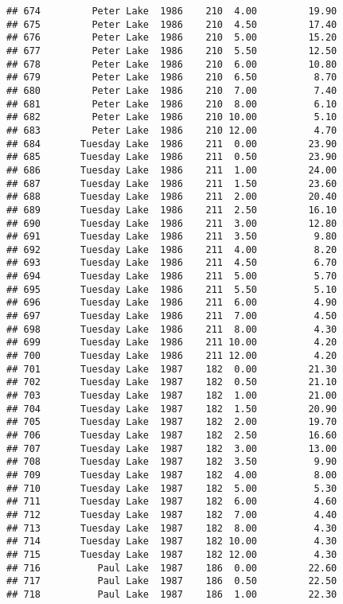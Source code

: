 \documentclass[
]{article}
\begin{document}
\begin{verbatim}
## 674         Peter Lake  1986    210  4.00         19.90
## 675         Peter Lake  1986    210  4.50         17.40
## 676         Peter Lake  1986    210  5.00         15.20
## 677         Peter Lake  1986    210  5.50         12.50
## 678         Peter Lake  1986    210  6.00         10.80
## 679         Peter Lake  1986    210  6.50          8.70
## 680         Peter Lake  1986    210  7.00          7.40
## 681         Peter Lake  1986    210  8.00          6.10
## 682         Peter Lake  1986    210 10.00          5.10
## 683         Peter Lake  1986    210 12.00          4.70
## 684       Tuesday Lake  1986    211  0.00         23.90
## 685       Tuesday Lake  1986    211  0.50         23.90
## 686       Tuesday Lake  1986    211  1.00         24.00
## 687       Tuesday Lake  1986    211  1.50         23.60
## 688       Tuesday Lake  1986    211  2.00         20.40
## 689       Tuesday Lake  1986    211  2.50         16.10
## 690       Tuesday Lake  1986    211  3.00         12.80
## 691       Tuesday Lake  1986    211  3.50          9.80
## 692       Tuesday Lake  1986    211  4.00          8.20
## 693       Tuesday Lake  1986    211  4.50          6.70
## 694       Tuesday Lake  1986    211  5.00          5.70
## 695       Tuesday Lake  1986    211  5.50          5.10
## 696       Tuesday Lake  1986    211  6.00          4.90
## 697       Tuesday Lake  1986    211  7.00          4.50
## 698       Tuesday Lake  1986    211  8.00          4.30
## 699       Tuesday Lake  1986    211 10.00          4.20
## 700       Tuesday Lake  1986    211 12.00          4.20
## 701       Tuesday Lake  1987    182  0.00         21.30
## 702       Tuesday Lake  1987    182  0.50         21.10
## 703       Tuesday Lake  1987    182  1.00         21.00
## 704       Tuesday Lake  1987    182  1.50         20.90
## 705       Tuesday Lake  1987    182  2.00         19.70
## 706       Tuesday Lake  1987    182  2.50         16.60
## 707       Tuesday Lake  1987    182  3.00         13.00
## 708       Tuesday Lake  1987    182  3.50          9.90
## 709       Tuesday Lake  1987    182  4.00          8.00
## 710       Tuesday Lake  1987    182  5.00          5.30
## 711       Tuesday Lake  1987    182  6.00          4.60
## 712       Tuesday Lake  1987    182  7.00          4.40
## 713       Tuesday Lake  1987    182  8.00          4.30
## 714       Tuesday Lake  1987    182 10.00          4.30
## 715       Tuesday Lake  1987    182 12.00          4.30
## 716          Paul Lake  1987    186  0.00         22.60
## 717          Paul Lake  1987    186  0.50         22.50
## 718          Paul Lake  1987    186  1.00         22.30

\end{verbatim}
\end{document}
